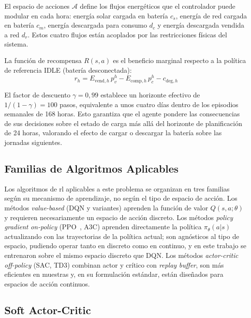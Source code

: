 \documentclass[12pt, a4paper, twoside]{report}
\begin{document}
El espacio de acciones $\mathcal{A}$ define los flujos energéticos que el
controlador puede modular en cada hora: energía solar cargada en batería $c_s$,
energía de red cargada en batería $c_m$, energía descargada para consumo $d_c$
y energía descargada vendida a red $d_r$. Estos cuatro flujos están acoplados
por las restricciones físicas del sistema.

La función de recompensa $R(s,a)$ es el beneficio marginal respecto a la
política de referencia IDLE (batería desconectada):
\begin{equation}
  r_h = E_{\text{vend},h}\,p_v^h - E_{\text{comp},h}\,p_c^h - c_{\text{deg},h}
  \label{eq:recompensa}
\end{equation}

El factor de descuento $\gamma = 0{,}99$ establece un horizonte efectivo de
$1/(1-\gamma) = 100$ pasos, equivalente a unos cuatro días dentro de los
episodios semanales de 168 horas. Esto garantiza que el agente pondere las
consecuencias de sus decisiones sobre el estado de carga más allá del horizonte
de planificación de 24 horas, valorando el efecto de cargar o descargar la
batería sobre las jornadas siguientes.

\subsection{Familias de Algoritmos Aplicables}

Los algoritmos de \acrshort{rl} aplicables a este problema se organizan en tres
familias según su mecanismo de aprendizaje, no según el tipo de espacio de
acción. Los métodos \textit{value-based} (DQN y variantes) aprenden la función
de valor $Q(s,a;\theta)$ y requieren necesariamente un espacio de acción
discreto. Los métodos \textit{policy gradient on-policy} (PPO~\citep{Schulman2017}, A3C)
aprenden
directamente la política $\pi_\theta(a|s)$ actualizando con las trayectorias de
la política actual; son agnósticos al tipo de espacio, pudiendo operar tanto en
discreto como en continuo, y en este trabajo se entrenaron sobre el mismo
espacio discreto que DQN. Los métodos \textit{actor-critic off-policy} (SAC,
TD3) combinan actor y crítico con \textit{replay buffer}, son más eficientes en
muestras y, en su formulación estándar, están diseñados para espacios de acción
continuos.

\subsection{Soft Actor-Critic}
\end{document}
